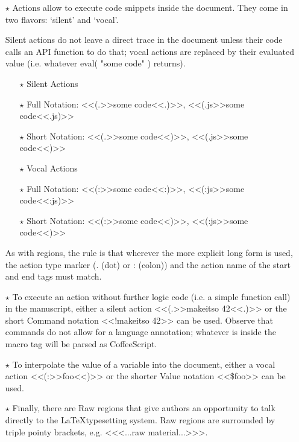 \begin{multicols}{2}
\begin{itemize}
\end{itemize}\begin{itemize}\item[$\star$] {\mktsStyleBold{}Actions} allow to execute code snippets inside the document. They
come in two flavors: ‘silent’ and ‘vocal’.\mktsShowpar\par
Silent actions do not
leave a direct trace in the document unless their code calls an
API function to do that; vocal actions are replaced by their
evaluated value (i.e. whatever {\mktsStyleCode{}eval( "some code" )} returns).
\mktsShowpar\par
\begin{itemize}\item[$\star$] {\mktsStyleBold{}Silent Actions}
\item[$\star$] Full Notation: {\mktsStyleCode{}<<(.>>some code<<.)>>}, {\mktsStyleCode{}<<(.js>>some code<<.js)>>}
\item[$\star$] Short Notation: {\mktsStyleCode{}<<(.>>some code<<)>>}, {\mktsStyleCode{}<<(.js>>some code<<)>>}
\item[$\star$] {\mktsStyleBold{}Vocal Actions}
\item[$\star$] Full Notation: {\mktsStyleCode{}<<(:>>some code<<:)>>}, {\mktsStyleCode{}<<(:js>>some code<<:js)>>}
\item[$\star$] Short Notation: {\mktsStyleCode{}<<(:>>some code<<)>>}, {\mktsStyleCode{}<<(:js>>some code<<)>>}
\end{itemize}As with regions, the rule is that wherever the more explicit long form
is used, the action type marker ({\mktsStyleCode{}.} (dot) or {\mktsStyleCode{}:} (colon)) and the action
name of the start and end tags must match.\mktsShowpar\par

\item[$\star$] To execute an action without further logic code (i.e. a simple function call)  
in the manuscript, either a silent action {\mktsStyleCode{}<<(.>>makeitso 42<<.)>>} or the
short {\mktsStyleBold{}Command} notation {\mktsStyleCode{}<<!makeitso 42>>} can be used. Observe that
commands do not allow for a language annotation; whatever is inside
the macro tag will be parsed as CoffeeScript.\mktsShowpar\par

\item[$\star$] To interpolate the value of a variable into the document,
either a vocal action {\mktsStyleCode{}<<(:>>foo<<)>>} or the shorter {\mktsStyleBold{}Value}
notation {\mktsStyleCode{}<<\$foo>>} can be used.
\mktsShowpar\par

\item[$\star$] Finally, there are {\mktsStyleBold{}Raw} regions that give authors an opportunity
to talk directly to the \LaTeX typesetting system. Raw regions are
surrounded by triple pointy brackets, e.g. {\mktsStyleCode{}<<<...raw material...>>>}.\mktsShowpar\par

\end{itemize}\end{multicols}
